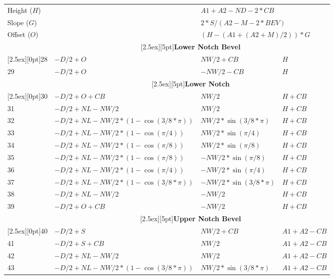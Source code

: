\documentclass[a4paper]{article}
\begin{document}
\begin{longtable}{|l|l|l|l|}
\hline
\multicolumn{2}{|l|}{Height ($H$)}  & \multicolumn{2}{|l|}{$A1+A2-ND-2*CB$}\\
\multicolumn{2}{|l|}{Slope ($G$)}   & \multicolumn{2}{|l|}{$2*S/(A2-M-2*BEV)$}\\
\multicolumn{2}{|l|}{Offset ($O$)}  & \multicolumn{2}{|l|}{$(H-(A1+(A2+M)/2))*G$}\\
\hline
&\multicolumn{3}{|c|}{\raisebox{0pt}[2.5ex][5pt]{\textbf{Lower Notch Bevel}}}\\\cline{2-4}
\raisebox{0pt}[2.5ex][0pt]{28}
   & $-D/2+O$       & $NW/2+CB$     & $H$\\
29 & $-D/2+O$       & $-NW/2-CB$    & $H$\\
\hline
&\multicolumn{3}{|c|}{\raisebox{0pt}[2.5ex][5pt]{\textbf{Lower Notch}}}\\\cline{2-4}
\raisebox{0pt}[2.5ex][0pt]{30}
   & $-D/2+O+CB$                      & $NW/2$                & $H+CB$\\
31 & $-D/2+NL-NW/2$                   & $NW/2$                & $H+CB$\\
32 & $-D/2+NL-NW/2*(1-\cos(3/8*\pi))$ & $NW/2*\sin(3/8*\pi)$  & $H+CB$\\
33 & $-D/2+NL-NW/2*(1-\cos(\pi/4))$   & $NW/2*\sin(\pi/4)$    & $H+CB$\\
34 & $-D/2+NL-NW/2*(1-\cos(\pi/8))$   & $NW/2*\sin(\pi/8)$    & $H+CB$\\
35 & $-D/2+NL-NW/2*(1-\cos(\pi/8))$   & $-NW/2*\sin(\pi/8)$   & $H+CB$\\
36 & $-D/2+NL-NW/2*(1-\cos(\pi/4))$   & $-NW/2*\sin(\pi/4)$   & $H+CB$\\
37 & $-D/2+NL-NW/2*(1-\cos(3/8*\pi))$ & $-NW/2*\sin(3/8*\pi)$ & $H+CB$\\
38 & $-D/2+NL-NW/2$                   & $-NW/2$               & $H+CB$\\
39 & $-D/2+O+CB$                      & $-NW/2$               & $H+CB$\\
\hline
&\multicolumn{3}{|c|}{\raisebox{0pt}[2.5ex][5pt]{\textbf{Upper Notch Bevel}}}\\\cline{2-4}
\raisebox{0pt}[2.5ex][0pt]{40}
   & $-D/2 + S$                       & $NW/2 + CB$           & $A1+A2-CB$\\
41 & $-D/2 + S + CB$                  & $NW/2$                & $A1+A2-CB$\\
42 & $-D/2+NL-NW/2$                   & $NW/2$                & $A1+A2-CB$\\
43 & $-D/2+NL-NW/2*(1-\cos(3/8*\pi))$ & $NW/2*\sin(3/8*\pi)$  & $A1+A2-CB$\\

\end{longtable}
\end{document}
